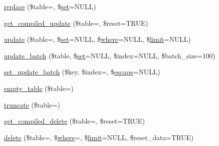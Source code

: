 \begin{DoxyCompactItemize}
\item 
\mbox{\hyperlink{class_c_i___d_b__query__builder_a9571a23501fb4dc9e724a06bcb78dc9a}{replace}} (\$table=\textquotesingle{}\textquotesingle{}, \$\mbox{\hyperlink{class_c_i___d_b__query__builder_a1589c46344f3a216a129cf65659b117c}{set}}=N\+U\+LL)
\item 
\mbox{\hyperlink{class_c_i___d_b__query__builder_a77fb150224714405067df7c300c317b0}{get\+\_\+compiled\+\_\+update}} (\$table=\textquotesingle{}\textquotesingle{}, \$reset=T\+R\+UE)
\item 
\mbox{\hyperlink{class_c_i___d_b__query__builder_a130a26da2dd4e4582ee18f42d71fe6e4}{update}} (\$table=\textquotesingle{}\textquotesingle{}, \$\mbox{\hyperlink{class_c_i___d_b__query__builder_a1589c46344f3a216a129cf65659b117c}{set}}=N\+U\+LL, \$\mbox{\hyperlink{class_c_i___d_b__query__builder_a2356c4b7b93fb83c62a354a8a0748222}{where}}=N\+U\+LL, \$\mbox{\hyperlink{class_c_i___d_b__query__builder_a875b0d4703f176c36e771d728a9a04a0}{limit}}=N\+U\+LL)
\item 
\mbox{\hyperlink{class_c_i___d_b__query__builder_a718928dc54d935761439538836f1e70d}{update\+\_\+batch}} (\$table, \$\mbox{\hyperlink{class_c_i___d_b__query__builder_a1589c46344f3a216a129cf65659b117c}{set}}=N\+U\+LL, \$index=N\+U\+LL, \$batch\+\_\+size=100)
\item 
\mbox{\hyperlink{class_c_i___d_b__query__builder_a7f212748fce6348224257ff09dec873a}{set\+\_\+update\+\_\+batch}} (\$key, \$index=\textquotesingle{}\textquotesingle{}, \$\mbox{\hyperlink{class_c_i___d_b__driver_ac8f37ca5703d4558c732e692194f8cd6}{escape}}=N\+U\+LL)
\item 
\mbox{\hyperlink{class_c_i___d_b__query__builder_af665fbf0b83f396d6c5529aca1f43517}{empty\+\_\+table}} (\$table=\textquotesingle{}\textquotesingle{})
\item 
\mbox{\hyperlink{class_c_i___d_b__query__builder_acaa636a6a61d4362c5a32941fc9932ba}{truncate}} (\$table=\textquotesingle{}\textquotesingle{})
\item 
\mbox{\hyperlink{class_c_i___d_b__query__builder_a3e2f8775363646e099009ff62b25a21a}{get\+\_\+compiled\+\_\+delete}} (\$table=\textquotesingle{}\textquotesingle{}, \$reset=T\+R\+UE)
\item 
\mbox{\hyperlink{class_c_i___d_b__query__builder_a482722b9989c53ed8ecd68b22df64507}{delete}} (\$table=\textquotesingle{}\textquotesingle{}, \$\mbox{\hyperlink{class_c_i___d_b__query__builder_a2356c4b7b93fb83c62a354a8a0748222}{where}}=\textquotesingle{}\textquotesingle{}, \$\mbox{\hyperlink{class_c_i___d_b__query__builder_a875b0d4703f176c36e771d728a9a04a0}{limit}}=N\+U\+LL, \$reset\+\_\+data=T\+R\+UE)

\end{DoxyCompactItemize}
